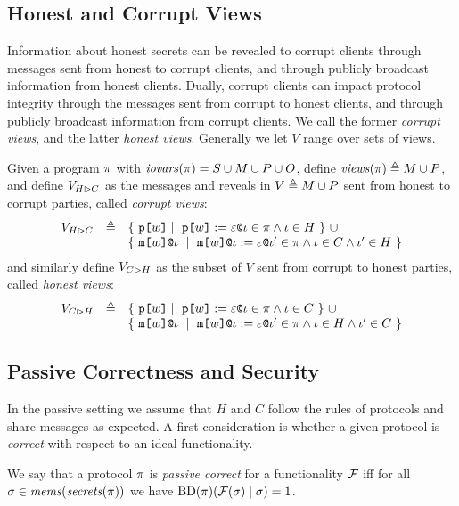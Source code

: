 \subsection{Honest and Corrupt Views}

Information about honest secrets can be revealed to corrupt clients
through messages sent from honest to corrupt clients, and through
publicly broadcast information from honest clients. Dually,
corrupt clients can impact protocol integrity through the messages
sent from corrupt to honest clients, and through publicly broadcast information
from corrupt clients. We call the former \emph{corrupt views}, and
the latter \emph{honest views}. Generally we let $V$ range over sets
of views.
\begin{definition}
  Given a program $\pi$ with $\mathit{iovars}(\pi) = S \cup M \cup P \cup O$,
  define $\mathit{views}(\pi) \triangleq M \cup P$, and define $V_{H \rhd C}$ as
  the messages and reveals in $V \triangleq M \cup P$ sent from honest to corrupt
  parties, called \emph{corrupt views}:
  $$
  \begin{array}{lcl}
    \houtputs & \defeq
        & \{\ \rvl{w} \mid\ \reveal{w}{\be}{\cid} \in \prog \wedge \cid \in H \ \}\ \cup \\
      & & \{\ \elab{\mesg{w}}{\cid}\ \mid\  \eassign{\mesg{w}}{\cid}{\be}{\cid'} \in
           \prog \wedge \cid \in C \wedge \cid' \in H \ \} 
  \end{array}
  $$
  and similarly define $V_{C \rhd H}$ as the subset of $V$ sent from corrupt to honest
  parties, called \emph{honest views}:
  $$
  \begin{array}{lcl}
    \cinputs &  \defeq
        & \{\ \rvl{w} \mid\ \reveal{w}{\be}{\cid} \in \prog \wedge \cid \in C \ \} \ \cup\\
      & & \{\ \elab{\mesg{w}}{\cid}\ \mid\  \eassign{\mesg{w}}{\cid}{\be}{\cid'} \in
              \prog \wedge \cid \in H \wedge \cid' \in C \ \}
  \end{array}
  $$
\end{definition}

\subsection{Passive Correctness and Security}

In the passive setting we assume that $H$ and $C$ follow the
rules of protocols and share messages as expected. A first
consideration is whether a given protocol is \emph{correct}
with respect to an ideal functionality. 
\begin{definition}[Passive Correctness]
  We say that a protocol $\pi$ is \emph{passive correct} for a functionality
  $\mathcal{F}$ iff for all $\sigma \in \mathit{mems}(\mathit{secrets}(\pi))$
  we have $\mathrm{BD}(\pi)(\mathcal{F}(\sigma) \mid \sigma) = 1$.
\end{definition}


